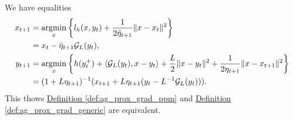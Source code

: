 \documentclass[12pt]{article}
\begin{document}
    \begin{proposition}
    \label{prop:derive_ag_prox_grad_tript}
       We have equalities
        \begin{align*}
            x_{t + 1} &= \mathop{\rm argmin}\limits_{x}
            \left\lbrace
                l_h(x, y_t) + \frac{1}{2\tilde \eta_{t + 1}} \Vert x - x_t\Vert^2
            \right\rbrace
            \\
            &= x_t - \tilde\eta_{t + 1} \mathcal G_L(y_t), 
            \\
            y_{t + 1} &= \mathop{\rm argmin}\limits_{x}
            \left\lbrace
                    h(y_t^+) + \langle \mathcal G_L(y_t), x - y_t\rangle + \frac{L}{2}\Vert x -y_t\Vert^2 + \frac{1}{2\eta_{t + 1}}\Vert x - x_{t + 1}\Vert^2
            \right\rbrace
            \\
            &= (1 + L\eta_{t + 1})^{-1}
            (x_{t + 1} + L\eta_{t + 1}(y_t - L^{-1}\mathcal  G_L(y_t))). 
        \end{align*}
        This thows
        \hyperref[def:ag_prox_grad_ppm]{Definition \ref*{def:ag_prox_grad_ppm}}
        and 
        \hyperref[def:ag_prox_grad_generic]{Definition \ref*{def:ag_prox_grad_generic}} 
        are equivalent. 
    \end{proposition}
\end{document}
